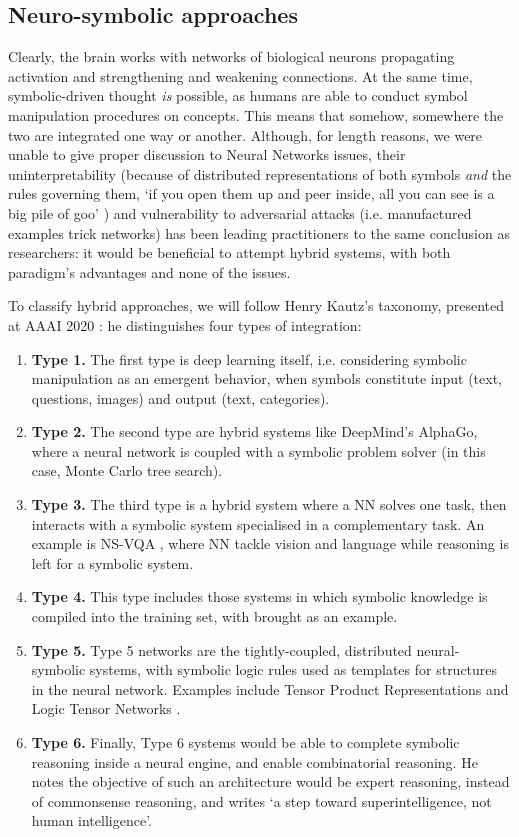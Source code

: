 \documentclass[../main.tex]{subfiles}
\begin{document}
\subsection{Neuro-symbolic approaches}
Clearly, the brain works with networks of biological neurons propagating activation and strengthening and weakening connections. At the same time, symbolic-driven thought \textit{is} possible, as humans are able to conduct symbol manipulation procedures on concepts. This means that somehow, somewhere the two are integrated one way or another. Although, for length reasons, we were unable to give proper discussion to Neural Networks issues, their uninterpretability (because of distributed representations of both symbols \textit{and} the rules governing them, \enquote*{if you open them up and peer inside,  all you can see is a big  pile of goo}  \parencite{mozerUsingRelevanceReduce1989}) and vulnerability to adversarial attacks (i.e. manufactured examples trick networks) has been leading practitioners to the same conclusion as researchers: it would be beneficial to attempt hybrid systems, with both paradigm's advantages and none of the issues.

To classify hybrid approaches, we will follow Henry Kautz's taxonomy, presented at AAAI 2020 \parencite{kautzAAAI2020TalkSlides2020}: he distinguishes four types of integration:
\begin{enumerate}
    \item \textbf{Type 1.} The first type is deep learning itself, i.e. considering symbolic manipulation as an emergent behavior, when symbols constitute input (text, questions, images) and output (text, categories).
    \item \textbf{Type 2.} The second type are hybrid systems like DeepMind's AlphaGo, where a neural network is coupled with a symbolic problem solver (in this case, Monte Carlo tree search).
    \item \textbf{Type 3.} The third type is a hybrid system where a NN solves one task, then interacts with a symbolic system specialised in a complementary task. An example is NS-VQA \parencite{yiNeuralsymbolicVQADisentangling2018}, where NN tackle vision and language while reasoning is left for a symbolic system.
    \item \textbf{Type 4.} This type includes those systems in which symbolic knowledge is compiled into the training set, with  \parencite{lampleDeepLearningSymbolic2019} brought as an example.
    \item \textbf{Type 5.} Type 5 networks are the tightly-coupled, distributed neural-symbolic systems, with symbolic logic rules used as templates for structures in the neural network. Examples include Tensor Product Representations \parencite{mccoyRNNsImplicitlyImplement2019} and Logic Tensor Networks \parencite{serafiniLogicTensorNetworks2016}.
    \item \textbf{Type 6.} Finally, Type 6 systems would be able to complete symbolic reasoning inside a neural engine, and enable combinatorial reasoning. He notes the objective of such an architecture would be expert reasoning, instead of commonsense reasoning, and writes \enquote*{a step toward superintelligence, not human intelligence}.
\end{enumerate}
\end{document}
